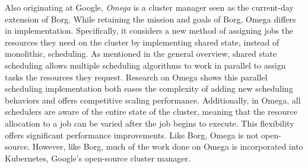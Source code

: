 Also originating at Google, \textit{Omega} is a cluster manager seen as the
current-day extension of Borg. While retaining the mission and goals of Borg,
Omega differs in implementation. Specifically, it considers a new method of
assigning jobs the resources they need on the cluster by implementing
shared state, instead of monolithic, scheduling. As mentioned in the general
overview, shared state scheduling allows multiple scheduling algorithms to work
in parallel to assign tasks the resources they request. Research on Omega shows
this parallel scheduling implementation both eases the complexity of adding new
scheduling behaviors and offers competitive scaling performance.\cite[pg.
358-359]{omega} Additionally, in Omega, all schedulers are aware of the entire
state of the cluster, meaning that the resource allocation to a job can be
varied after the job begins to execute. This flexibility offers significant
performance improvements.\cite[pg.352]{omega} Like Borg, Omega is not
open-source. However, like Borg, much of the work done on Omega is incorporated
into Kubernetes, Google's open-source cluster manager.
